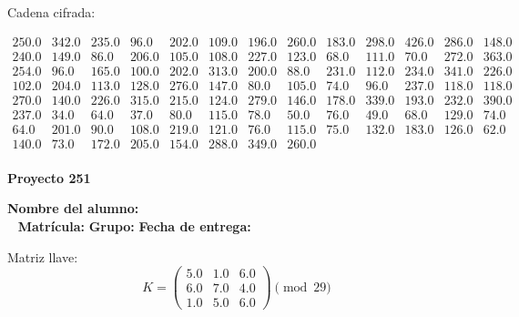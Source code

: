 \documentclass[12pt]{article}
\begin{document}
Cadena cifrada:
\begin{center}
$\begin{array}{lllllllllllll}
250.0 & 342.0 & 235.0 & 96.0 & 202.0 & 109.0 & 196.0 & 260.0 & 183.0 & 298.0 & 426.0 & 286.0 & 148.0\\
240.0 & 149.0 & 86.0 & 206.0 & 105.0 & 108.0 & 227.0 & 123.0 & 68.0 & 111.0 & 70.0 & 272.0 & 363.0\\
254.0 & 96.0 & 165.0 & 100.0 & 202.0 & 313.0 & 200.0 & 88.0 & 231.0 & 112.0 & 234.0 & 341.0 & 226.0\\
102.0 & 204.0 & 113.0 & 128.0 & 276.0 & 147.0 & 80.0 & 105.0 & 74.0 & 96.0 & 237.0 & 118.0 & 118.0\\
270.0 & 140.0 & 226.0 & 315.0 & 215.0 & 124.0 & 279.0 & 146.0 & 178.0 & 339.0 & 193.0 & 232.0 & 390.0\\
237.0 & 34.0 & 64.0 & 37.0 & 80.0 & 115.0 & 78.0 & 50.0 & 76.0 & 49.0 & 68.0 & 129.0 & 74.0\\
64.0 & 201.0 & 90.0 & 108.0 & 219.0 & 121.0 & 76.0 & 115.0 & 75.0 & 132.0 & 183.0 & 126.0 & 62.0\\
140.0 & 73.0 & 172.0 & 205.0 & 154.0 & 288.0 & 349.0 & 260.0\\
\end{array}$
\end{center}

\newpage


\textbf{Proyecto 251}

\textbf{Nombre del alumno:} \underline{\hspace{13cm}}\\\
\vspace{1cm}
\textbf{Matrícula:} \underline{\hspace{4cm}} \hspace{1cm}
\textbf{Grupo:} \underline{\hspace{2cm}}
\textbf{Fecha de entrega:} \underline{\hspace{2cm}}

\medskip

Matriz llave:
\[
K = \begin{pmatrix}
5.0 & 1.0 & 6.0\\
6.0 & 7.0 & 4.0\\
1.0 & 5.0 & 6.0
\end{pmatrix} \pmod{29}
\]
\end{document}
